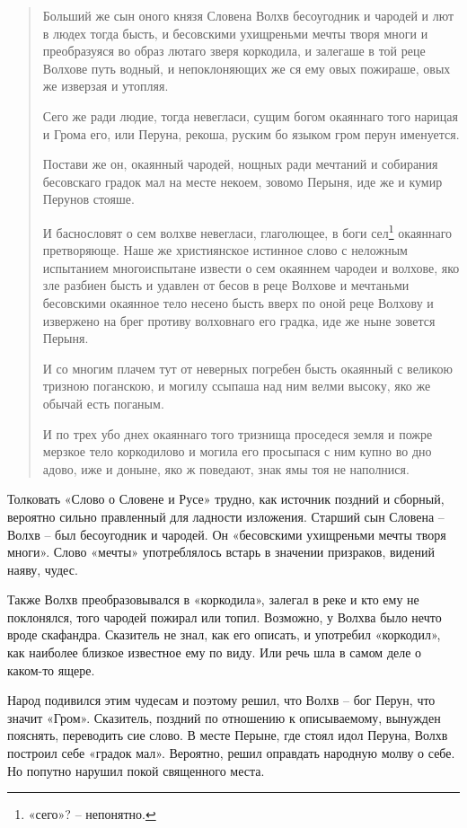 \begin{quotation}
Больший же сын оного князя Словена Волхв бесоугодник и чародей и лют в людех тогда бысть, и бесовскими ухищреньми мечты творя многи и преобразуяся во образ лютаго зверя коркодила, и залегаше в той реце Волхове путь водный, и непоклоняющих же ся ему овых пожираше, овых же изверзая и утопляя. 

Сего же ради людие, тогда невегласи, сущим богом окаяннаго того нарицая и Грома его, или Перуна, рекоша, руским бо языком гром перун именуется. 

Постави же он, окаянный чародей, нощных ради мечтаний и собирания бесовскаго градок мал на месте некоем, зовомо Перыня, иде же и кумир Перунов стояше. 

И баснословят о сем волхве невегласи, глаголющее, в боги сел\footnote{«сего»? – непонятно.} окаяннаго претворяюще. Наше же християнское истинное слово с неложным испытанием многоиспытане извести о сем окаяннем чародеи и волхове, яко зле разбиен бысть и удавлен от бесов в реце Волхове и мечтаньми бесовскими окаянное тело несено бысть вверх по оной реце Волхову и извержено на брег противу волховнаго его градка, иде же ныне зовется Перыня. 

И со многим плачем тут от неверных погребен бысть окаянный с великою тризною поганскою, и могилу ссыпаша над ним велми высоку, яко же обычай есть поганым. 

И по трех убо днех окаяннаго того тризнища проседеся земля и пожре мерзкое тело коркодилово и могила его просыпася с ним купно во дно адово, иже и доныне, яко ж поведают, знак ямы тоя не наполнися.
\end{quotation}
 
Толковать «Слово о Словене и Русе» трудно, как источник поздний и сборный, вероятно сильно правленный для ладности изложения. Старший сын Словена – Волхв – был бесоугодник и чародей. Он «бесовскими ухищреньми мечты творя многи». Слово «мечты» употреблялось встарь в значении призраков, видений наяву, чудес.

Также Волхв преобразовывался в «коркодила», залегал в реке и кто ему не поклонялся, того чародей пожирал или топил. Возможно, у Волхва было нечто вроде скафандра. Сказитель не знал, как его описать, и употребил «коркодил», как наиболее близкое известное ему по виду. Или речь шла в самом деле о каком-то ящере.

Народ подивился этим чудесам и поэтому решил, что Волхв – бог Перун, что значит «Гром». Сказитель, поздний по отношению к описываемому, вынужден пояснять, переводить сие слово. В месте Перыне, где стоял идол Перуна, Волхв построил себе «градок мал». Вероятно, решил оправдать народную молву о себе. Но попутно нарушил покой священного места.

